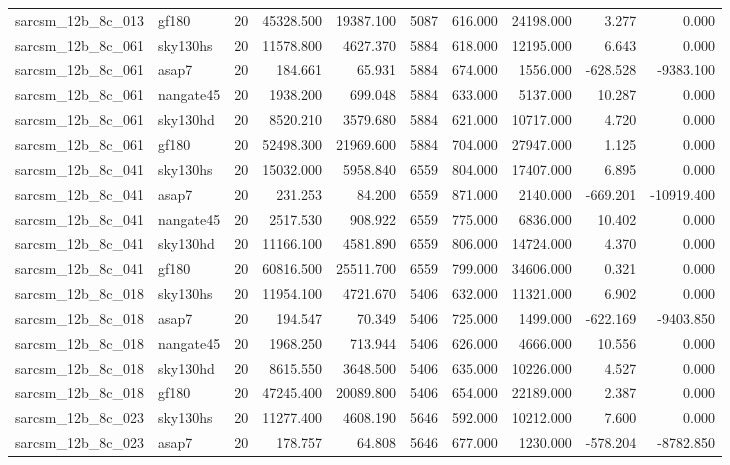 \documentclass{article}
\begin{document}
\begin{longtable}{llrrrrrrrr}
sarcsm\_12b\_8c\_013 & gf180 & 20 & 45328.500 & 19387.100 & 5087 & 616.000 & 24198.000 & 3.277 & 0.000 \\
sarcsm\_12b\_8c\_061 & sky130hs & 20 & 11578.800 & 4627.370 & 5884 & 618.000 & 12195.000 & 6.643 & 0.000 \\
sarcsm\_12b\_8c\_061 & asap7 & 20 & 184.661 & 65.931 & 5884 & 674.000 & 1556.000 & -628.528 & -9383.100 \\
sarcsm\_12b\_8c\_061 & nangate45 & 20 & 1938.200 & 699.048 & 5884 & 633.000 & 5137.000 & 10.287 & 0.000 \\
sarcsm\_12b\_8c\_061 & sky130hd & 20 & 8520.210 & 3579.680 & 5884 & 621.000 & 10717.000 & 4.720 & 0.000 \\
sarcsm\_12b\_8c\_061 & gf180 & 20 & 52498.300 & 21969.600 & 5884 & 704.000 & 27947.000 & 1.125 & 0.000 \\
sarcsm\_12b\_8c\_041 & sky130hs & 20 & 15032.000 & 5958.840 & 6559 & 804.000 & 17407.000 & 6.895 & 0.000 \\
sarcsm\_12b\_8c\_041 & asap7 & 20 & 231.253 & 84.200 & 6559 & 871.000 & 2140.000 & -669.201 & -10919.400 \\
sarcsm\_12b\_8c\_041 & nangate45 & 20 & 2517.530 & 908.922 & 6559 & 775.000 & 6836.000 & 10.402 & 0.000 \\
sarcsm\_12b\_8c\_041 & sky130hd & 20 & 11166.100 & 4581.890 & 6559 & 806.000 & 14724.000 & 4.370 & 0.000 \\
sarcsm\_12b\_8c\_041 & gf180 & 20 & 60816.500 & 25511.700 & 6559 & 799.000 & 34606.000 & 0.321 & 0.000 \\
sarcsm\_12b\_8c\_018 & sky130hs & 20 & 11954.100 & 4721.670 & 5406 & 632.000 & 11321.000 & 6.902 & 0.000 \\
sarcsm\_12b\_8c\_018 & asap7 & 20 & 194.547 & 70.349 & 5406 & 725.000 & 1499.000 & -622.169 & -9403.850 \\
sarcsm\_12b\_8c\_018 & nangate45 & 20 & 1968.250 & 713.944 & 5406 & 626.000 & 4666.000 & 10.556 & 0.000 \\
sarcsm\_12b\_8c\_018 & sky130hd & 20 & 8615.550 & 3648.500 & 5406 & 635.000 & 10226.000 & 4.527 & 0.000 \\
sarcsm\_12b\_8c\_018 & gf180 & 20 & 47245.400 & 20089.800 & 5406 & 654.000 & 22189.000 & 2.387 & 0.000 \\
sarcsm\_12b\_8c\_023 & sky130hs & 20 & 11277.400 & 4608.190 & 5646 & 592.000 & 10212.000 & 7.600 & 0.000 \\
sarcsm\_12b\_8c\_023 & asap7 & 20 & 178.757 & 64.808 & 5646 & 677.000 & 1230.000 & -578.204 & -8782.850 \\

\end{longtable}
\end{document}
